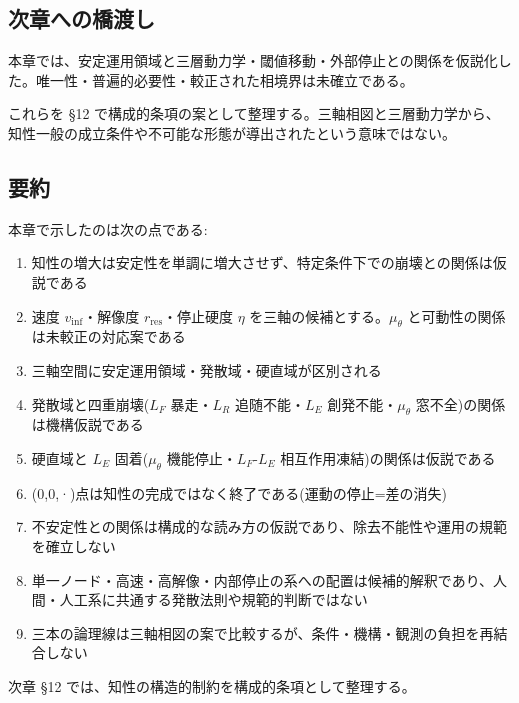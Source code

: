 \bigskip


\subsection{次章への橋渡し}


本章では、安定運用領域と三層動力学・閾値移動・外部停止との関係を仮説化した。唯一性・普遍的必要性・較正された相境界は未確立である。

これらを \S{}12 で構成的条項の案として整理する。三軸相図と三層動力学から、知性一般の成立条件や不可能な形態が導出されたという意味ではない。

\bigskip


\subsection{要約}


本章で示したのは次の点である:

\begin{enumerate}
\item 知性の増大は安定性を単調に増大させず、特定条件下での崩壊との関係は仮説である
\item 速度 $v_{\text{inf}}$・解像度 $r_{\text{res}}$・停止硬度 $\eta$ を三軸の候補とする。$\mu_\theta$ と可動性の関係は未較正の対応案である
\item 三軸空間に安定運用領域・発散域・硬直域が区別される
\item 発散域と四重崩壊($L_F$ 暴走・$L_R$ 追随不能・$L_E$ 創発不能・$\mu_\theta$ 窓不全)の関係は機構仮説である
\item 硬直域と $L_E$ 固着($\mu_\theta$ 機能停止・$L_F$-$L_E$ 相互作用凍結)の関係は仮説である
\item (0,0,·)点は知性の完成ではなく終了である(運動の停止=差の消失)
\item 不安定性との関係は構成的な読み方の仮説であり、除去不能性や運用の規範を確立しない
\item 単一ノード・高速・高解像・内部停止の系への配置は候補的解釈であり、人間・人工系に共通する発散法則や規範的判断ではない
\item 三本の論理線は三軸相図の案で比較するが、条件・機構・観測の負担を再結合しない
\end{enumerate}


次章 \S{}12 では、知性の構造的制約を構成的条項として整理する。

\bigskip
